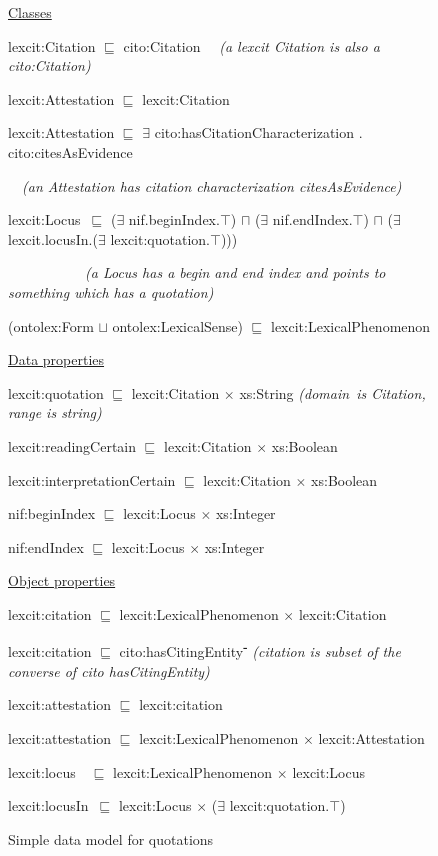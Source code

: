 \documentclass[10pt]{article}
\begin{document}
\begin{figure}


\begingroup
\fontsize{9pt}{10.8pt}\selectfont 
\uline{Classes}

lexcit:Citation $\sqsubseteq$  cito:Citation
\ \ \textit{(a lexcit Citation is also a cito:Citation)}

lexcit:Attestation  $\sqsubseteq$  lexcit:Citation%

 lexcit:Attestation $\sqsubseteq$  $ \exists $  cito:hasCitationCharacterization . cito:citesAsEvidence 

\ \ \textit{(an Attestation has citation characterization citesAsEvidence)}

lexcit:Locus\  $\sqsubseteq$  ($ \exists $  nif.beginIndex.$\top$) $\sqcap$  ($ \exists $  nif.endIndex.$\top$) $\sqcap$  ($ \exists $  lexcit.locusIn.($ \exists $  lexcit:quotation.$\top$)))

 \ \ \ \ \ \ \ \ \ \ \  \textit{(a Locus has a begin and end index and points to something which has a quotation)}

 (ontolex:Form $\sqcup$  ontolex:LexicalSense) $\sqsubseteq$  lexcit:LexicalPhenomenon

\par



\uline{Data properties}

 lexcit:quotation $\sqsubseteq$  lexcit:Citation $ \times $  xs:String \textit{(domain\ is  Citation, range is string)}

 lexcit:readingCertain $\sqsubseteq$  lexcit:Citation $ \times $  xs:Boolean%

 lexcit:interpretationCertain $\sqsubseteq$  lexcit:Citation $ \times $  xs:Boolean


 nif:beginIndex $\sqsubseteq$  lexcit:Locus $ \times $  xs:Integer

nif:endIndex $\sqsubseteq$  lexcit:Locus $ \times $  xs:Integer



\uline{Object properties}

 lexcit:citation $\sqsubseteq$  lexcit:LexicalPhenomenon $ \times $  lexcit:Citation

lexcit:citation $\sqsubseteq$   cito:hasCitingEntity\textbf{\textsuperscript{-}} \textit{(citation is subset of the converse of cito hasCitingEntity)}

lexcit:attestation $\sqsubseteq$  lexcit:citation

lexcit:attestation $\sqsubseteq$  lexcit:LexicalPhenomenon $ \times $  lexcit:Attestation

lexcit:locus\ \ $\sqsubseteq$   lexcit:LexicalPhenomenon $ \times $  lexcit:Locus

lexcit:locusIn\  $\sqsubseteq$  lexcit:Locus $ \times $  ($ \exists $  lexcit:quotation.$\top$)


\caption{Simple data model for quotations}
\label{fig:attmodel}
\endgroup
\end{figure}
\end{document}
